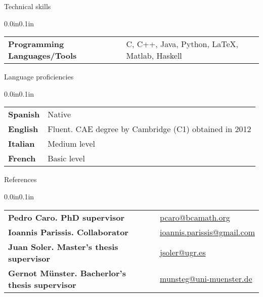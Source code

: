 \documentclass{resume} %
\makeatletter
\newcommand{\entry}[2]{#1 & #2 \tabularnewline} %
\newcommand{\tableEnv}[2]{%
  \begin{rSection}{#1} %
    \begin{adjustwidth}{0.0in}{0.1in} %
      \begin{tabularx}{\linewidth}{@{} >{\bfseries}l @{\hspace{6ex}} X @{}}
        #2 %
      \end{tabularx}
    \end{adjustwidth}
  \end{rSection}
}
\makeatother
\begin{document}
\tableEnv{Technical skills}{
    \entry{Programming Languages/Tools}{C, C++, Java, Python, \LaTeX, Matlab, Haskell}
}


\tableEnv{Language proficiencies}{
    \entry{Spanish}{Native}
    \entry{English}{Fluent. CAE degree by Cambridge (C1) obtained in 2012}
    \entry{Italian}{Medium level}
    \entry{French}{Basic level}
}

\tableEnv{References}{
    \entry{Pedro Caro. PhD supervisor}{\href{mailto:pcaro@bcamath.org}{pcaro@bcamath.org}}
    \entry{Ioannis Parissis. Collaborator}{\href{mailto:ioannis.parissis@gmail.com}{ioannis.parissis@gmail.com}}
    \entry{Juan Soler. Master's thesis supervisor}{\href{mailto:jsoler@ugr.es}{jsoler@ugr.es}}
    \entry{Gernot M\"unster. Bacherlor's thesis supervisor}{\href{mailto:munsteg@uni-muenster.de}{munsteg@uni-muenster.de}}


}
\end{document}
